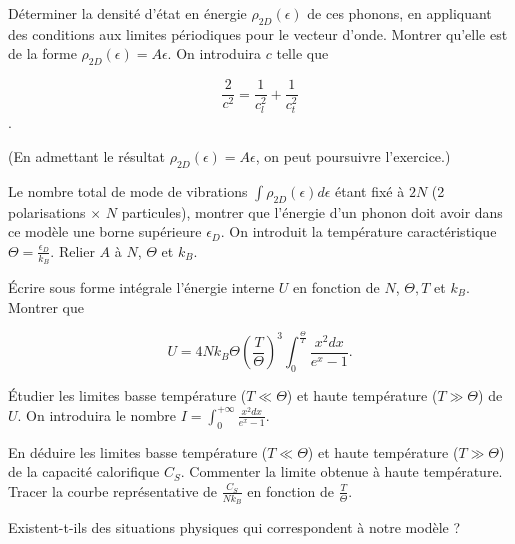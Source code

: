 \documentclass[utf8, 11pt]{feuille}
\begin{document}
\question  Déterminer la densité d'état en énergie $\rho_{2D}(\epsilon)$ de ces phonons, en appliquant des conditions aux limites périodiques pour le vecteur d'onde. Montrer qu'elle est de la forme $\rho_{2D}(\epsilon)=A \epsilon$. On introduira $c$ telle que

$$\frac{2}{c^2}=\frac{1}{c_l^2}+\frac{1}{c_t^2}$$.

(En admettant le résultat $\rho_{2D}(\epsilon)=A \epsilon$, on peut poursuivre l'exercice.)

\question Le nombre total de mode de vibrations $\int \rho_{2D}(\epsilon) d\epsilon$ étant fixé à $2 N$ (2 polarisations  $\times$ $N$ particules), montrer que l'énergie d'un phonon doit avoir dans ce modèle une borne supérieure $\epsilon_D$. On introduit la température caractéristique $\Theta=\frac{\epsilon_D}{k_B}$. Relier $A$ à $N$, $\Theta$ et $k_B$.

\question \'Ecrire sous forme intégrale l'énergie interne $U$ en fonction de $N$, $\Theta, T$ et $k_B$.  Montrer que

$$U=4 N k_B \Theta \left( \frac{T}{\Theta} \right)^3  \int_0^{\frac{\Theta}{T}} \frac{x^2 dx}{e^x-1}.$$

\question \'Etudier les limites basse température ($T \ll \Theta$) et haute température ($T \gg \Theta$) de $U$. On introduira le nombre $I=\int_0^{+\infty} \frac{x^2 dx}{e^x-1}$.
 

\question En déduire les limites basse température ($T \ll \Theta$) et haute température ($T \gg \Theta$) de la capacité calorifique $C_S$. Commenter la limite obtenue à haute température. Tracer la courbe représentative de $\frac{C_S}{N k_B}$ en fonction de $\frac{T}{\Theta}$.

\question Existent-t-ils des situations physiques qui correspondent à notre modèle ?
\end{document}
